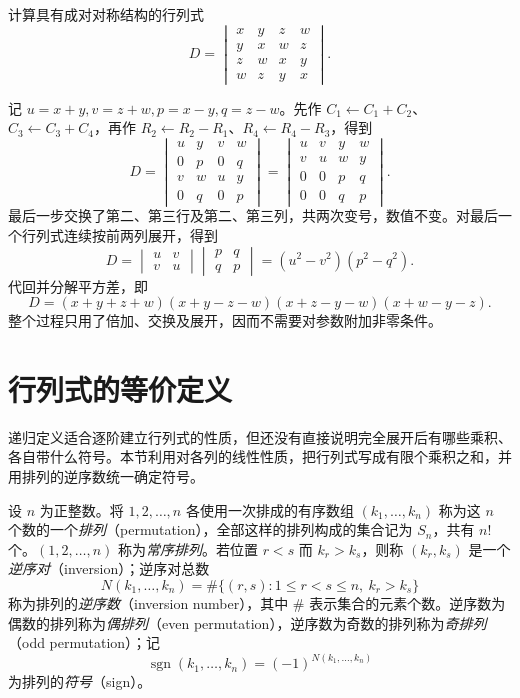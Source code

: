 \begin{example}
计算具有成对对称结构的行列式
\[
    D=\begin{vmatrix}
        x&y&z&w\\
        y&x&w&z\\
        z&w&x&y\\
        w&z&y&x
    \end{vmatrix}.
\]
\end{example}
\begin{solve}
记 $u=x+y,v=z+w,p=x-y,q=z-w$。先作 $C_1\leftarrow C_1+C_2$、$C_3\leftarrow C_3+C_4$，再作 $R_2\leftarrow R_2-R_1$、$R_4\leftarrow R_4-R_3$，得到
\[
    D=\begin{vmatrix}
        u&y&v&w\\
        0&p&0&q\\
        v&w&u&y\\
        0&q&0&p
    \end{vmatrix}
     =\begin{vmatrix}
        u&v&y&w\\
        v&u&w&y\\
        0&0&p&q\\
        0&0&q&p
    \end{vmatrix}.
\]
最后一步交换了第二、第三行及第二、第三列，共两次变号，数值不变。对最后一个行列式连续按前两列展开，得到
\[
    D=\begin{vmatrix}u&v\\v&u\end{vmatrix}
      \begin{vmatrix}p&q\\q&p\end{vmatrix}
     =(u^2-v^2)(p^2-q^2).
\]
代回并分解平方差，即
\[
    D=(x+y+z+w)(x+y-z-w)(x+z-y-w)(x+w-y-z).
\]
整个过程只用了倍加、交换及展开，因而不需要对参数附加非零条件。
\end{solve}

\section{行列式的等价定义}
\label{sec:determinant-equivalent-definition}

递归定义适合逐阶建立行列式的性质，但还没有直接说明完全展开后有哪些乘积、各自带什么符号。本节利用对各列的线性性质，把行列式写成有限个乘积之和，并用排列的逆序数统一确定符号。

\begin{definition}
\label{def:permutation-inversion}
设 $n$ 为正整数。将 $1,2,\ldots,n$ 各使用一次排成的有序数组 $(k_1,\ldots,k_n)$ 称为这 $n$ 个数的一个\emph{排列}（permutation），全部这样的排列构成的集合记为 $S_n$，共有 $n!$ 个。$(1,2,\ldots,n)$ 称为\emph{常序排列}。若位置 $r<s$ 而 $k_r>k_s$，则称 $(k_r,k_s)$ 是一个\emph{逆序对}（inversion）；逆序对总数
\[
    N(k_1,\ldots,k_n)
      =\#\{(r,s):1\leq r<s\leq n,\ k_r>k_s\}
\]
称为排列的\emph{逆序数}（inversion number），其中 $\#$ 表示集合的元素个数。逆序数为偶数的排列称为\emph{偶排列}（even permutation），逆序数为奇数的排列称为\emph{奇排列}（odd permutation）；记
\[
    \operatorname{sgn}(k_1,\ldots,k_n)=(-1)^{N(k_1,\ldots,k_n)}
\]
为排列的\emph{符号}（sign）。
\end{definition}

